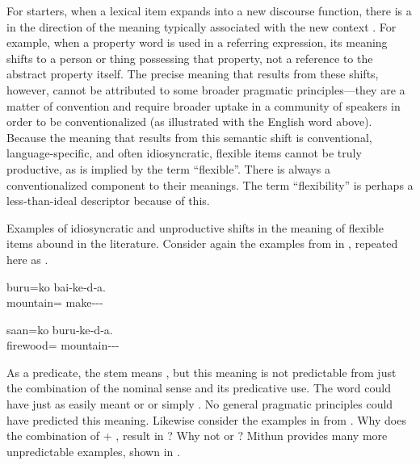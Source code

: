 For starters, when a lexical item expands into a new discourse function, there is a  in the direction of the meaning typically associated with the new context \parencites[74--77]{Croft1991}[73]{Croft2001b}. For example, when a property word is used in a referring expression, its meaning shifts to a person or thing possessing that property, not a reference to the abstract property itself. The precise meaning that results from these shifts, however, cannot be attributed to some broader pragmatic principles—they are a matter of convention and require broader uptake in a community of speakers in order to be conventionalized (as illustrated with the English word  above). Because the meaning that results from this semantic shift is conventional, language-specific, and often idiosyncratic, flexible items cannot be truly productive, as is implied by the term \enquote{flexible}. There is always a conventionalized component to their meanings. The term \enquote{flexibility} is perhaps a less-than-ideal descriptor because of this.

Examples of idiosyncratic and unproductive shifts in the meaning of flexible items abound in the literature. Consider again the examples from  in , repeated here as .

\begin{exe}
  \ex\label{ex:2.16}
  \begin{xlist}

    \ex
    \gll buru=ko                bai‑ke‑d‑a.\\
         mountain= make‑‑‑\\

    \ex
    \gll saan=ko                buru‑ke‑d‑a.\\
         firewood= mountain‑‑‑\\

  \end{xlist}
\end{exe}

\noindent As a predicate, the stem  means , but this meaning is not predictable from just the combination of the nominal sense  and its predicative use. The word could have just as easily meant  or  or simply . No general pragmatic principles could have predicted this meaning. Likewise consider the  examples in  from . Why does the combination of   +  ,  result in  ? Why not  or ? Mithun provides many more unpredictable examples, shown in .

